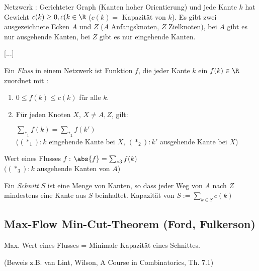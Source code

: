Netzwerk : Gerichteter Graph (Kanten hoher Orientierung)
und jede Kante $k$ hat Gewicht $c(k) \geq 0, c(k \in \R$
($c(k) = $ Kapazität von $k$). 
Es gibt zwei ausgezeichnete Ecken $A$ und $Z$ ($A$ Anfangsknoten, $Z$ Zielknoten), bei $A$ gibt es nur ausgehende Kanten, bei $Z$ gibt es nur eingehende Kanten.

[...]

Ein \emph{Fluss} in einem Netzwerk ist Funktion $f$, die jeder Kante $k$ ein $f(k) \in \R$ zuordnet mit :

\begin{enumerate}
	\item
	$0 \leq f(k) \leq c(k)$ für alle $k$.
	
	
	\item 
	Für jeden Knoten $X$, $X \neq A, Z$, gilt:
	
	$\sum_{*_1}f(k) = \sum_{*_2}f(k')$
	\\ ($(*_1): k$ eingehende Kante bei $X$, $(*_2): k'$ ausgehende Kante bei $X$)
	
\end{enumerate}

Wert eines Flusses $f$ :
$\abs{f} = \sum_{*3}f(k)$
\\$((*_3): k$ ausgehende Kanten von $A$)

Ein \emph{Schnitt} $S$ ist eine Menge von Kanten, so dass jeder Weg von $A$ nach $Z$ mindestens eine Kante aus $S$ beinhaltet.
Kapazität von $S := \sum_{k \in S} c(k)$

\subsection*{Max-Flow Min-Cut-Theorem (Ford, Fulkerson)}

Max. Wert eines Flusses = Minimale Kapazität eines Schnittes.

(Beweis z.B. van Lint, Wilson, A Course in Combinatorics, Th. 7.1)
















